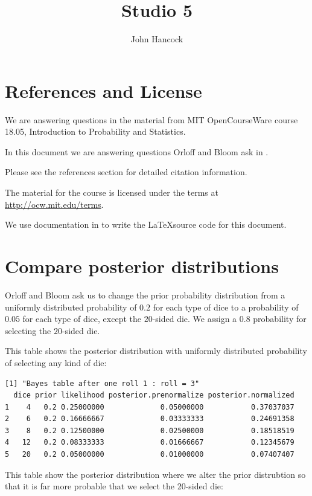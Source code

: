 \documentclass[a5paper,11pt]{article}
\author{John Hancock}
\title{Studio 5}
\begin{document}
\maketitle
\tableofcontents
\section{References and License}
We are answering questions in the material from MIT OpenCourseWare
course 18.05, Introduction to Probability and Statistics.

In this document we are answering questions Orloff and Bloom ask in
\cite{studio5}.

Please see the references section for detailed citation information.

The material for the course is licensed under the terms at
\url{http://ocw.mit.edu/terms}.

We use documentation in to write the \LaTeX source code for this document.

\section{Compare posterior distributions}

Orloff and Bloom ask us to change the prior probability distribution from
a uniformly distributed probability of $0.2$ for each type of dice to
a probability of $0.05$ for each type of
dice, except the $20$-sided die.  We assign a $0.8$ probability for
selecting the $20$-sided die.

This table shows the posterior distribution with uniformly distributed
probability of selecting any kind of die:

\begin{lstlisting}
[1] "Bayes table after one roll 1 : roll = 3"
  dice prior likelihood posterior.prenormalize posterior.normalized
1    4   0.2 0.25000000             0.05000000           0.37037037
2    6   0.2 0.16666667             0.03333333           0.24691358
3    8   0.2 0.12500000             0.02500000           0.18518519
4   12   0.2 0.08333333             0.01666667           0.12345679
5   20   0.2 0.05000000             0.01000000           0.07407407
\end{lstlisting}

This table show the posterior distribution where we alter the
prior distrubtion so that it is far more probable that we select
the 20-sided die:
\end{document}
